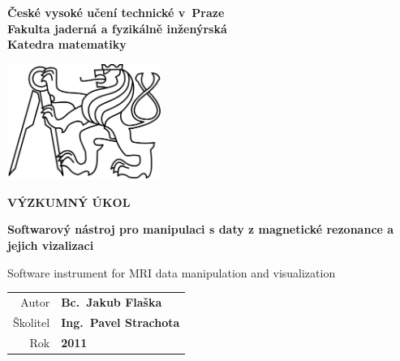 \documentclass[a4paper,12pt]{report}	%
\newcommand{\cvut}{České vysoké učení technické v~Praze}
\newcommand{\fjfi}{Fakulta jaderná a fyzikálně inženýrská}
\newcommand{\km}{Katedra matematiky}
\newcommand{\nazevcz}{Softwarový nástroj pro manipulaci s daty z magnetické rezonance a jejich vizalizaci}
\newcommand{\nazeven}{Software instrument for MRI data manipulation and visualization}
\newcommand{\autor}{Bc.~Jakub Flaška}
\newcommand{\rok}{2011}
\newcommand{\vedouci}{Ing.~Pavel Strachota}
\begin{document}
\thispagestyle{empty}

\begin{center}
	{\fontsize{20}{20.5} \bf \cvut\\[2mm] \fjfi \\[2mm] \km}	%
	\vfill
		\begin{center}
			\includegraphics[width=50mm]{Text/IMG/00_Logo_CVUT_bw.jpg}	%
		\end{center}
	\vfill
		{\fontsize{35}{36.5} \bf VÝZKUMNÝ ÚKOL}		%
	\vfill			
		{\fontsize{20}{20.5} \bf \nazevcz \vspace{5mm} \par \nazeven}	%
	\vfill	
		{\large %
			\begin{tabular}{rl}
				Autor 		& {\bf	\autor}			\\					%
				Školitel 	& {\bf	\vedouci }		\\					%
				Rok		& {\bf	\rok }			\\					%
			\end{tabular}
		}
\end{center}
\end{document}
